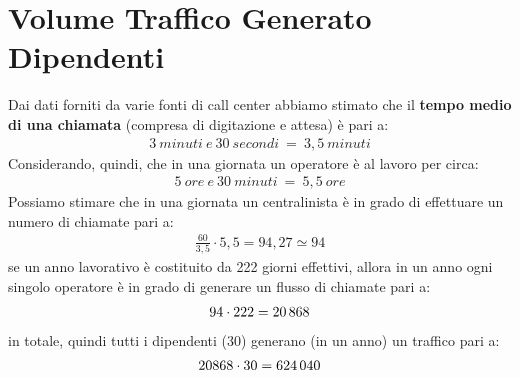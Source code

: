 \section[Volume Traffico Generato Dipendenti]{Volume Traffico Generato Dipendenti}
Dai dati forniti da varie fonti di call center abbiamo stimato che il \textbf{tempo medio di una chiamata} (compresa di digitazione e attesa) è pari a:
	\begin{equation}
	\label{eq:durata_media_chiamate}
	\begin{split}
		3 \: minuti \: e \: 30 \: secondi \: = \: 3,5 \: minuti  
	\end{split}
	\end{equation}
Considerando, quindi, che in una giornata un operatore è al lavoro per circa:
	\begin{equation}
	\label{eq:durata_orario_lavoro}
	\begin{split}
		5 \: ore \: e \: 30 \: minuti \: = \: 5,5 \: ore  
	\end{split}
	\end{equation}
Possiamo stimare che in una giornata un centralinista è in grado di effettuare un numero di chiamate pari a:
	\begin{equation}
	\label{eq:num_chiamate_singolo_operatore_giorno}
	\begin{split}
		\frac{60}{3,5} \cdot 5,5 = 94,27 \simeq 94 
	\end{split}
	\end{equation}
se un anno lavorativo è costituito da 222 giorni effettivi, allora in un anno ogni singolo operatore è in grado di generare un flusso di chiamate pari a:
	\begin{equation}
	\label{eq:num_chiamate_singolo_operatore_anno}
	\begin{split}
		94 \cdot 222 = 20\thinspace 868 
	\end{split}
	\end{equation}
in totale, quindi tutti i dipendenti (30) generano (in un anno) un traffico pari a:
	\begin{equation}
	\label{eq:num_chiamate_azienda_anno}
	\begin{split}
		20868 \cdot 30 = 624\thinspace 040 
	\end{split}
	\end{equation}
